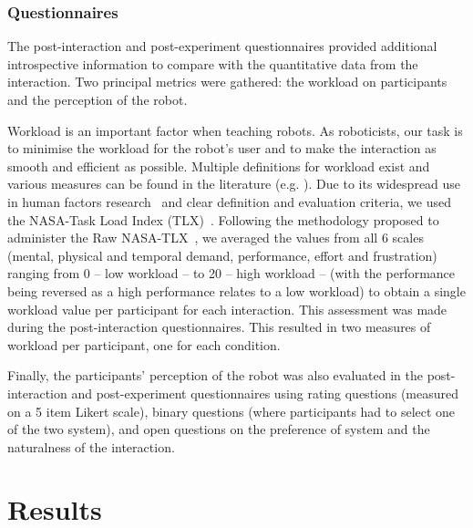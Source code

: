 \subsubsection{Questionnaires} \label{ssec:control_questionnaires}

The post-interaction and post-experiment questionnaires provided additional introspective information to compare with the quantitative data from the interaction. Two principal metrics were gathered: the workload on participants and the perception of the robot. 

Workload is an important factor when teaching robots. As roboticists, our task is to minimise the workload for the robot's user and to make the interaction as smooth and efficient as possible. Multiple definitions for workload exist and various measures can be found in the literature (e.g. \citealt{wierwille1983evaluation,moray2013mental}). Due to its widespread use in human factors research~\citep{hart2006nasa} and clear definition and evaluation criteria, we used the NASA-Task Load Index (TLX)~\citep{hart1988development}. Following the methodology proposed to administer the Raw NASA-TLX~\citep{hart2006nasa}, we averaged the values from all 6 scales (mental, physical and temporal demand, performance, effort and frustration) ranging from 0 -- low workload -- to 20 -- high workload -- (with the performance being reversed as a high performance relates to a low workload) to obtain a single workload value per participant for each interaction. This assessment was made during the post-interaction questionnaires. This resulted in two measures of workload per participant, one for each condition.

Finally, the participants' perception of the robot was also evaluated in the post-interaction and post-experiment questionnaires using rating questions (measured on a 5 item Likert scale), binary questions (where participants had to select one of the two system), and open questions on the preference of system and the naturalness of the interaction. 

\section{Results}

